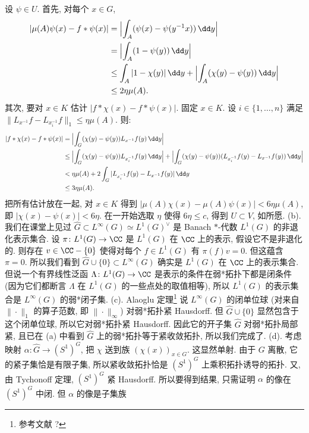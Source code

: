 \begin{solution}
\[\]
设 $\psi \in U$. 首先, 对每个 $x \in G$,
\begin{align*}
|\mu(A)\psi(x) - f * \psi(x)| &= \Bigl|\int_A (\psi(x) - \psi(y^{-1}x))\,\dd y\Bigr| \\
&= \Bigl|\int_A (1 - \psi(y))\,\dd y\Bigr| \\
&\leq \int_A |1 - \chi(y)|\,\dd y + \Bigl|\int_A (\chi(y) - \psi(y))\,\dd y\Bigr| \\
&\leq 2\eta\mu(A).
\end{align*}
其次, 要对 $x \in K$ 估计 $|f * \chi(x) - f * \psi(x)|$. 固定 $x \in K$. 设 $i \in \{1, \ldots, n\}$ 满足 $\|L_{x^{-1}}f - L_{x_i^{-1}}f\|_1 \leq \eta\mu(A)$. 则:
\begin{align*}
|f * \chi(x) - f * \psi(x)| &= \Bigl|\int_G (\chi(y) - \psi(y))L_{x^{-1}}f(y)\,\dd y\Bigr| \\
&\leq \Bigl|\int_G (\chi(y) - \psi(y))L_{x_i^{-1}}f(y)\,\dd y\Bigr| + \Bigl|\int_G (\chi(y) - \psi(y))(L_{x_i^{-1}}f(y) - L_{x^{-1}}f(y))\,\dd y\Bigr| \\
&< \eta\mu(A) + 2\int_G |L_{x_i^{-1}}f(y) - L_{x^{-1}}f(y)|\,\dd y \\
&\leq 3\eta\mu(A).
\end{align*}
把所有估计放在一起, 对 $x \in K$ 得到 $|\mu(A)\chi(x) - \mu(A)\psi(x)| < 6\eta\mu(A)$, 即 $|\chi(x) - \psi(x)| < 6\eta$. 在一开始选取 $\eta$ 使得 $6\eta \leq c$, 得到 $U \subset V$, 如所愿.
(b). 我们在课堂上见过 $\widehat{G} \subset L^{\infty}(G) \simeq L^1(G)^{\vee}$ 是 Banach $*$-代数 $L^1(G)$ 的非退化表示集合. 设 $\pi \colon L^1(G) \to \CC$ 是 $L^1(G)$ 在 $\CC$ 上的表示, 假设它不是非退化的. 则存在 $v \in \CC - \{0\}$ 使得对每个 $f \in L^1(G)$ 有 $\pi(f)v = 0$. 但这蕴含 $\pi = 0$. 所以我们看到 $\widehat{G} \cup \{0\} \subset L^{\infty}(G)$ 确实是 $L^1(G)$ 在 $\CC$ 上的表示集合. 但说一个有界线性泛函 $\Lambda \colon L^1(G) \to \CC$ 是表示的条件在弱*拓扑下都是闭条件 (因为它们都断言 $\Lambda$ 在 $L^1(G)$ 的一些点处的取值相等), 所以 $L^1(G)$ 的表示集合是 $L^{\infty}(G)$ 的弱*闭子集.
(c). Alaoglu 定理\footnote{参考文献 ?} 说 $L^{\infty}(G)$ 的闭单位球 (对来自 $\|\cdot\|_1$ 的算子范数, 即 $\|\cdot\|_{\infty}$) 对弱*拓扑紧 Hausdorff. 但 $\widehat{G} \cup \{0\}$ 显然包含于这个闭单位球, 所以它对弱*拓扑紧 Hausdorff. 因此它的开子集 $\widehat{G}$ 对弱*拓扑局部紧, 且已在 (a) 中看到 $\widehat{G}$ 上的弱*拓扑等于紧收敛拓扑, 所以我们完成了.
(d). 考虑映射 $\alpha \colon \widehat{G} \to (S^1)^G$, 把 $\chi$ 送到族 $(\chi(x))_{x \in G}$. 这显然单射. 由于 $G$ 离散, 它的紧子集恰是有限子集, 所以紧收敛拓扑恰是 $(S^1)^G$ 上乘积拓扑诱导的拓扑. 又, 由 Tychonoff 定理, $(S^1)^G$ 紧 Hausdorff. 所以要得到结果, 只需证明 $\alpha$ 的像在 $(S^1)^G$ 中闭. 但 $\alpha$ 的像是子集族

\end{solution}
